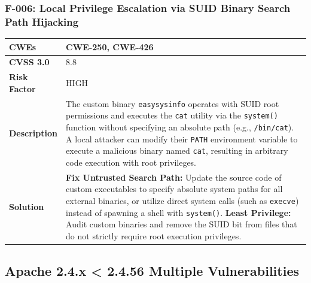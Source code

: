 \subsubsection{F-006: Local Privilege Escalation via SUID Binary Search Path Hijacking}
\begin{tabular}{|p{2.8cm}|p{12.2cm}|}
\hline
\textbf{CWEs} & CWE-250, CWE-426 \\ \hline
\textbf{CVSS 3.0} & 8.8 \\ \hline
\textbf{Risk Factor} & HIGH \\ \hline
\textbf{Description} & The custom binary \texttt{easysysinfo} operates with SUID root permissions and executes the \texttt{cat} utility via the \texttt{system()} function without specifying an absolute path (e.g., \texttt{/bin/cat}). A local attacker can modify their \texttt{PATH} environment variable to execute a malicious binary named \texttt{cat}, resulting in arbitrary code execution with root privileges. \\ \hline
\textbf{Solution} & \textbf{Fix Untrusted Search Path:} Update the source code of custom executables to specify absolute system paths for all external binaries, or utilize direct system calls (such as \texttt{execve}) instead of spawning a shell with \texttt{system()}. \newline \textbf{Least Privilege:} Audit custom binaries and remove the SUID bit from files that do not strictly require root execution privileges. \\ \hline
\end{tabular}

%
%
\subsection{Apache 2.4.x < 2.4.56 Multiple Vulnerabilities}

